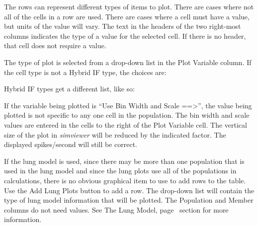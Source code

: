 \documentclass[12pt,openany,oneside]{book}
\newcommand{\tiref}[1]{#1, page~\pageref{#1}}
\newcommand{\prog}[1]{\textit{{#1}}}
\newcommand{\inquotes}[1]{{{``#1''}}}
\begin{document}
The rows can represent different types of items to plot. There are cases
where not all of the cells in a row are used. There are cases where a cell
must have a value, but units of the value will vary.  The text in the
headers of the two right-most columns indicates the type of a value for
the selected cell. If there is no header, that cell does not require a
value.

\begin{samepage}
The type of plot is selected from a drop-down list in the Plot Variable
column. If the cell type is not a Hybrid IF type, the choices are:
\bigskip


\bigskip
Hybrid IF types get a different list, like so:

\end{samepage}
\bigskip

If the variable being plotted is \inquotes{Use Bin Width and Scale
==\textgreater}, the value being plotted is not specific to any one cell in
the population. The bin width and scale values are entered in the cells
to the right of the Plot Variable cell. The vertical size of the plot in
\prog{simviewer} will be reduced by the indicated factor. The displayed
spikes/second will still be correct.

If the lung model is used, since there may be more than one population
that is used in the lung model and since the lung plots use all of the
populations in calculations, there is no obvious graphical item to use to
add rows to the table. Use the Add Lung Plots button to add a row. The
drop-down list will contain the type of lung model information that will be
plotted. The Population and Member columns do not need values. See
\tiref{The Lung Model} section for more information.
\end{document}
